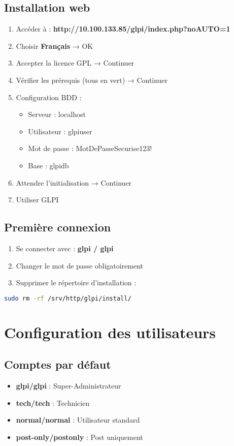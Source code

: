 \documentclass[12pt,a4paper]{article}
\begin{document}
\subsection{Installation web}
\begin{enumerate}
    \item Accéder à : \textbf{http://10.100.133.85/glpi/index.php?noAUTO=1}
    \item Choisir \textbf{Français} → OK
    \item Accepter la licence GPL → Continuer
    \item Vérifier les prérequis (tous en vert) → Continuer
    \item Configuration BDD :
    \begin{itemize}
        \item Serveur : localhost
        \item Utilisateur : glpiuser
        \item Mot de passe : MotDePasseSecurise123!
        \item Base : glpidb
    \end{itemize}
    \item Attendre l'initialisation → Continuer
    \item Utiliser GLPI
\end{enumerate}

\subsection{Première connexion}
\begin{enumerate}
    \item Se connecter avec : \textbf{glpi / glpi}
    \item Changer le mot de passe obligatoirement
    \item Supprimer le répertoire d'installation :
\end{enumerate}

\begin{lstlisting}[language=bash]
sudo rm -rf /srv/http/glpi/install/
\end{lstlisting}

\section{Configuration des utilisateurs}

\subsection{Comptes par défaut}
\begin{itemize}
    \item \textbf{glpi/glpi} : Super-Administrateur
    \item \textbf{tech/tech} : Technicien
    \item \textbf{normal/normal} : Utilisateur standard
    \item \textbf{post-only/postonly} : Post uniquement
\end{itemize}
\end{document}
